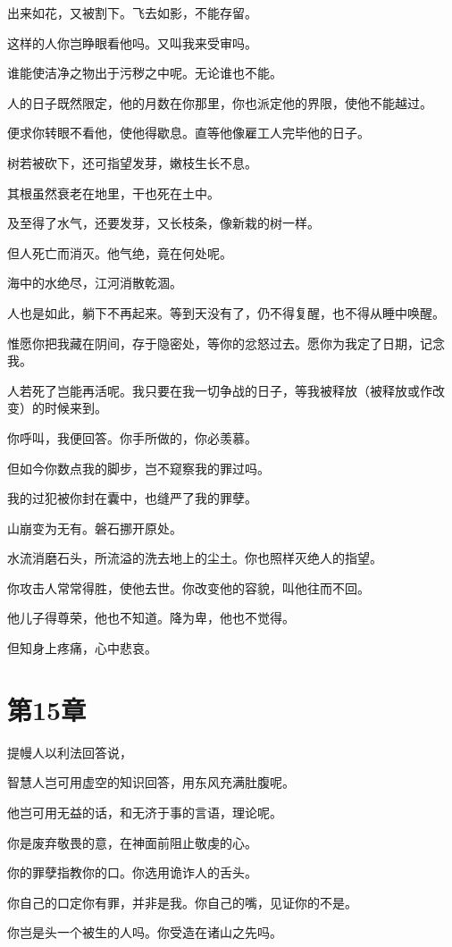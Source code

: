 \documentclass[12pt,oneside]{book}
\begin{document}
出来如花，又被割下。飞去如影，不能存留。

这样的人你岂睁眼看他吗。又叫我来受审吗。

谁能使洁净之物出于污秽之中呢。无论谁也不能。

人的日子既然限定，他的月数在你那里，你也派定他的界限，使他不能越过。

便求你转眼不看他，使他得歇息。直等他像雇工人完毕他的日子。

树若被砍下，还可指望发芽，嫩枝生长不息。

其根虽然衰老在地里，干也死在土中。

及至得了水气，还要发芽，又长枝条，像新栽的树一样。

但人死亡而消灭。他气绝，竟在何处呢。

海中的水绝尽，江河消散乾涸。

人也是如此，躺下不再起来。等到天没有了，仍不得复醒，也不得从睡中唤醒。

惟愿你把我藏在阴间，存于隐密处，等你的忿怒过去。愿你为我定了日期，记念我。

人若死了岂能再活呢。我只要在我一切争战的日子，等我被释放（被释放或作改变）的时候来到。

你呼叫，我便回答。你手所做的，你必羡慕。

但如今你数点我的脚步，岂不窥察我的罪过吗。

我的过犯被你封在囊中，也缝严了我的罪孽。

山崩变为无有。磐石挪开原处。

水流消磨石头，所流溢的洗去地上的尘土。你也照样灭绝人的指望。

你攻击人常常得胜，使他去世。你改变他的容貌，叫他往而不回。

他儿子得尊荣，他也不知道。降为卑，他也不觉得。

但知身上疼痛，心中悲哀。


\chapter{第15章}
提幔人以利法回答说，

智慧人岂可用虚空的知识回答，用东风充满肚腹呢。

他岂可用无益的话，和无济于事的言语，理论呢。

你是废弃敬畏的意，在神面前阻止敬虔的心。

你的罪孽指教你的口。你选用诡诈人的舌头。

你自己的口定你有罪，并非是我。你自己的嘴，见证你的不是。

你岂是头一个被生的人吗。你受造在诸山之先吗。
\end{document}
